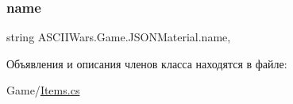 \subsubsection{\texorpdfstring{name}{name}}
{\footnotesize\ttfamily string A\+S\+C\+I\+I\+Wars.\+Game.\+J\+S\+O\+N\+Material.\+name\hspace{0.3cm}{\ttfamily [get]}, {\ttfamily [set]}}



Объявления и описания членов класса находятся в файле\+:\begin{DoxyCompactItemize}
\item 
Game/\hyperlink{_items_8cs}{Items.\+cs}\end{DoxyCompactItemize}
